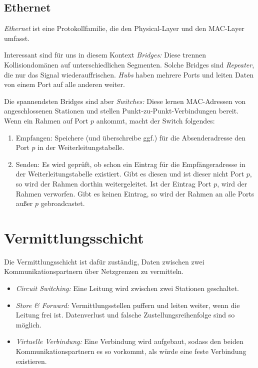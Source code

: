 \documentclass[a4paper,parskip=half*,DIV=15,fontsize=11pt]{scrartcl}
\begin{document}
\subsection{Ethernet}

\emph{Ethernet} ist eine Protokollfamilie, die den Physical-Layer und den MAC-Layer umfasst.

Interessant sind für uns in diesem Kontext \emph{Bridges:} Diese trennen Kollisiondomänen auf unterschiedlichen Segmenten. Solche Bridges sind \emph{Repeater}, die nur das Signal wiederauffrischen. \emph{Hubs} haben mehrere Ports und leiten Daten von einem Port auf alle anderen weiter.

Die spannendsten Bridges sind aber \emph{Switches:} Diese lernen MAC-Adressen von angeschlossenen Stationen und stellen Punkt-zu-Punkt-Verbindungen bereit. Wenn ein Rahmen auf Port $p$ ankommt, macht der Switch folgendes:

\begin{enumerate}
\item Empfangen: Speichere (und überschreibe ggf.) für die Absenderadresse den Port $p$ in der Weiterleitungstabelle.
\item Senden: Es wird geprüft, ob schon ein Eintrag für die Empfängeradresse in der Weiterleitungstabelle existiert. Gibt es diesen und ist dieser nicht Port $p$, so wird der Rahmen dorthin weitergeleitet. Ist der Eintrag Port $p$, wird der Rahmen verworfen. Gibt es keinen Eintrag, so wird der Rahmen an alle Ports außer $p$ gebroadcastet.
\end{enumerate}

\section{Vermittlungsschicht}

Die Vermittlungsschicht ist dafür zuständig, Daten zwischen zwei Kommunikationspartnern über Netzgrenzen zu vermitteln.

\begin{itemize}
\item \emph{Circuit Switching:} Eine Leitung wird zwischen zwei Stationen geschaltet.
\item \emph{Store \& Forward:} Vermittlungsstellen puffern und leiten weiter, wenn die Leitung frei ist. Datenverlust und falsche Zustellungsreihenfolge sind so möglich.
\item \emph{Virtuelle Verbindung:} Eine Verbindung wird aufgebaut, sodass den beiden Kommunikationspartnern es so vorkommt, als würde eine feste Verbindung existieren.
\end{itemize}
\end{document}

